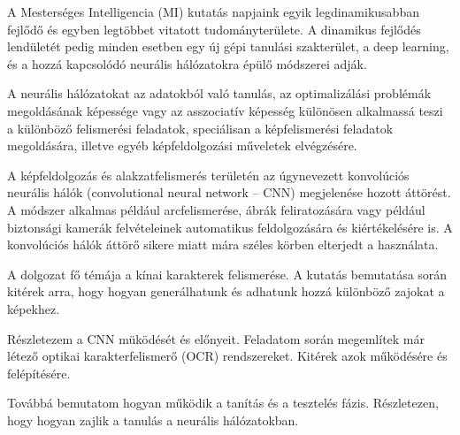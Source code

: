
A Mesterséges Intelligencia (MI) kutatás napjaink egyik legdinamikusabban fejlődő és egyben legtöbbet vitatott tudományterülete. A dinamikus fejlődés lendületét pedig minden esetben egy új gépi tanulási szakterület, a deep learning, és a hozzá kapcsolódó neurális hálózatokra épülő módszerei adják.

A neurális hálózatokat az adatokból való tanulás, az optimalizálási problémák megoldásának képessége vagy az asszociatív képesség különösen alkalmassá teszi a különböző felismerési feladatok, speciálisan a képfelismerési feladatok megoldására, illetve egyéb képfeldolgozási műveletek elvégzésére.

A képfeldolgozás és alakzatfelismerés területén az úgynevezett konvolúciós neurális hálók (convolutional neural network -- CNN) megjelenése hozott áttörést. A módszer alkalmas például arcfelismerése, ábrák feliratozására vagy például biztonsági kamerák felvételeinek automatikus feldolgozására és kiértékelésére is. A konvolúciós hálók áttörő sikere miatt mára széles körben elterjedt a használata.

A dolgozat fő témája a kínai karakterek felismerése. A kutatás bemutatása során kitérek arra, hogy hogyan generálhatunk és adhatunk hozzá különböző zajokat a képekhez.

Részletezem a CNN müködését és előnyeit. Feladatom során megemlítek már létező optikai karakterfelismerő (OCR) rendszereket. Kitérek azok működésére és felépítésére.

Továbbá bemutatom hogyan működik a tanítás és a tesztelés fázis. Részletezen, hogy hogyan zajlik a tanulás a neurális hálózatokban.
